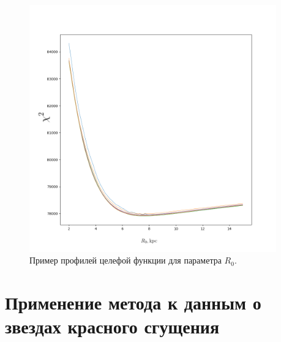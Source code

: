 \documentclass{matmex-diploma-custom}
\begin{document}
\begin{figure}[h!]
        \begin{center}
\begin{minipage}[h]{0.8\linewidth}
        \includegraphics[width=0.95\textwidth]{../imgs/profiles.png}
\end{minipage}
        \caption{Пример профилей целефой функции для параметра $R_0$.}
        \end{center}
\end{figure}


\section{Применение метода к данным о звездах красного сгущения}
\end{document}
